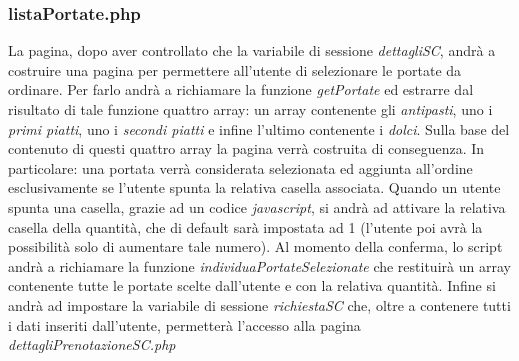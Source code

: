\documentclass [a4paper, 12pt]{book}
\begin{document}
\subsubsection{listaPortate.php}
La pagina, dopo aver controllato che la variabile di sessione \textit{dettagliSC}, andrà a costruire una pagina per permettere all'utente di selezionare le portate da ordinare. Per farlo andrà a richiamare la funzione \textit{getPortate} ed estrarre dal risultato di tale funzione quattro array: un array contenente gli \textit{antipasti}, uno i \textit{primi piatti}, uno i \textit{secondi piatti} e infine l'ultimo contenente i \textit{dolci}. Sulla base del contenuto di questi quattro array la pagina verrà costruita di conseguenza. In particolare: una portata verrà considerata selezionata ed aggiunta all'ordine esclusivamente se l'utente spunta la relativa casella associata. Quando un utente spunta una casella, grazie ad un codice \textit{javascript}, si andrà ad attivare la relativa casella della quantità, che di default sarà impostata ad 1 (l'utente poi avrà la possibilità solo di aumentare tale numero). Al momento della conferma, lo script andrà a richiamare la funzione \textit{individuaPortateSelezionate} che restituirà un array contenente tutte le portate scelte dall'utente e con la relativa quantità. Infine si andrà ad impostare la variabile di sessione \textit{richiestaSC} che, oltre a contenere tutti i dati inseriti dall'utente, permetterà l'accesso alla pagina \textit{dettagliPrenotazioneSC.php}
\end{document}
